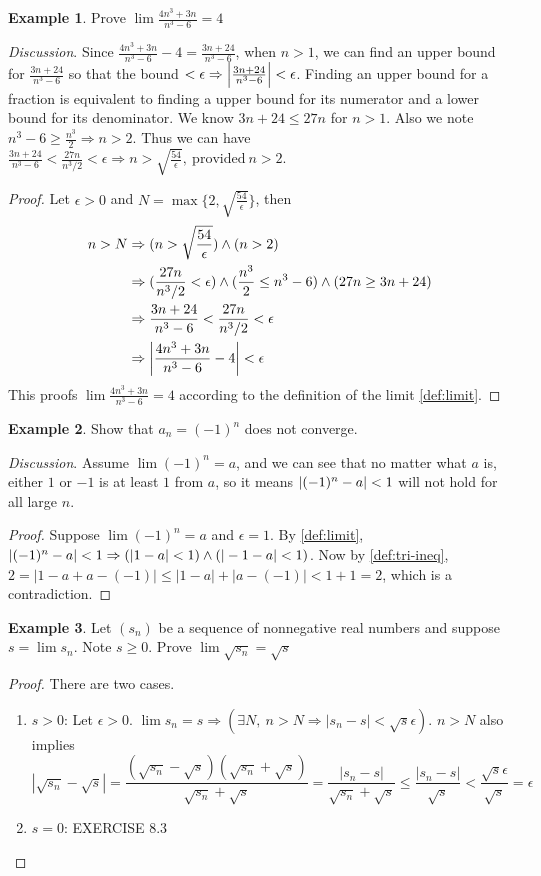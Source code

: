 \documentclass[12pt, lettersize]{book}
\theoremstyle{plain}
\theoremstyle{definition}
\newtheorem*{eg}{Example}
\theoremstyle{remark}
\begin{document}
	\begin{eg}
		Prove $\lim\frac{4n^3+3n}{n^3-6}=4$
	\end{eg}
	\emph{Discussion}. Since $\frac{4n^3+3n}{n^3-6}-4 = \frac{3n+24}{n^3-6}$, when $n>1$, we can find an upper bound for
	$\frac{3n+24}{n^3-6}$ so that the bound $<\epsilon \Rightarrow \abs{\frac{3n+24}{n^3-6}}<\epsilon$. Finding an upper bound for a fraction is equivalent to finding a upper bound for its numerator and a lower bound for its denominator.
	We know $3n+24\leq27n$ for $n>1$. Also we note $n^3-6\geq\frac{n^3}{2} \Rightarrow n>2$. Thus we can have $\frac{3n+24}{n^3-6}<\frac{27n}{n^3/2}<\epsilon \Rightarrow n>\sqrt{\frac{54}{\epsilon}},\ \text{provided}\ n>2$.
	\begin{proof}
		Let $\epsilon>0$ and $N=\max\{2,\sqrt{\frac{54}{\epsilon}}\}$, then
		\begin{align*}
			n>N &\Rightarrow (n>\sqrt{\frac{54}{\epsilon}})\land(n>2)\\
			&\Rightarrow (\frac{27n}{n^3/2}<\epsilon)\land(\frac{n^3}{2}\leq n^3-6)\land(27n\geq3n+24)\\
			&\Rightarrow \frac{3n+24}{n^3-6} < \frac{27n}{n^3/2} < \epsilon\\
			&\Rightarrow \abs{\frac{4n^3+3n}{n^3-6}-4} < \epsilon
		\end{align*}
		This proofs $\lim\frac{4n^3+3n}{n^3-6}=4$ according to the definition of the limit \ref{def:limit}.
	\end{proof}
	
	\begin{eg}
		Show that $a_n=(-1)^n$ does not converge.
	\end{eg}
	\emph{Discussion}. Assume $\lim(-1)^n=a$, and we can see that no matter what $a$ is, either $1$ or $-1$ is at least
	$1$ from $a$, so it means $\abs{(-1)^n-a}<1$ will not hold for all large $n$.
	\begin{proof}
		Suppose $\lim(-1)^n=a$ and $\epsilon = 1$. By \ref{def:limit}, $\abs{(-1)^n-a}<1 \Rightarrow (|1-a|<1)\land(|-1-a|<1)$.
		Now by \ref{def:tri-ineq}, $2=|1-a+a-(-1)|\leq|1-a|+|a-(-1)|<1+1=2$, which is a contradiction. 
	\end{proof}
	
	\begin{eg}
		Let $(s_n)$ be a sequence of nonnegative real numbers and suppose $s=\lim s_n$. Note $s\geq0$. Prove $\lim\sqrt{s_n}=\sqrt{s}$
	\end{eg}
	\begin{proof}
		There are two cases.
		\begin{enumerate}
			\item $s>0$: Let $\epsilon>0$. $\lim s_n=s \Rightarrow (\exists N,\ n>N \Rightarrow |s_n-s|<\sqrt{s}\epsilon)$.
			$n>N$ also implies
			\begin{displaymath}
				|\sqrt{s_n}-\sqrt{s}|=\frac{(\sqrt{s_n}-\sqrt{s})(\sqrt{s_n}+\sqrt{s})}{\sqrt{s_n}+\sqrt{s}}=\frac{|s_n-s|}{\sqrt{s_n}+\sqrt{s}}\leq\frac{|s_n-s|}{\sqrt{s}}<\frac{\sqrt{s}\epsilon}{\sqrt{s}}=\epsilon
			\end{displaymath}
			\item $s=0$: EXERCISE 8.3 
		\end{enumerate}
	\end{proof}
	
\end{document}
